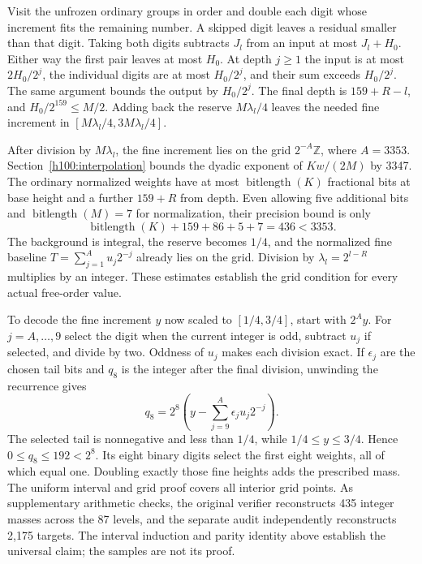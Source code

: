 Visit the unfrozen ordinary groups in order and double each digit whose increment fits the remaining number. A skipped digit leaves a residual smaller than that digit. Taking both digits subtracts \(J_l\) from an input at most \(J_l+H_0\). Either way the first pair leaves at most \(H_0\). At depth \(j\ge1\) the input is at most \(2H_0/2^j\), the individual digits are at most \(H_0/2^j\), and their sum exceeds \(H_0/2^j\). The same argument bounds the output by \(H_0/2^j\). The final depth is \(159+R-l\), and \(H_0/2^{159}\le M/2\). Adding back the reserve \(M\lambda_l/4\) leaves the needed fine increment in \([M\lambda_l/4,3M\lambda_l/4]\).

After division by \(M\lambda_l\), the fine increment lies on the grid \(2^{-A}\mathbb Z\), where \(A=3353\). Section~\ref{h100:interpolation} bounds the dyadic exponent of \(Kw/(2M)\) by 3347. The ordinary normalized weights have at most \(\operatorname{bitlength}(K)\) fractional bits at base height and a further \(159+R\) from depth. Even allowing five additional bits and \(\operatorname{bitlength}(M)=7\) for normalization, their precision bound is only \[
 \operatorname{bitlength}(K)+159+86+5+7=436<3353.
\] The background is integral, the reserve becomes \(1/4\), and the normalized fine baseline \(T=\sum_{j=1}^A u_j2^{-j}\) already lies on the grid. Division by \(\lambda_l=2^{l-R}\) multiplies by an integer. These estimates establish the grid condition for every actual free-order value.

To decode the fine increment \(y\) now scaled to \([1/4,3/4]\), start with \(2^Ay\). For \(j=A,\ldots,9\) select the digit when the current integer is odd, subtract \(u_j\) if selected, and divide by two. Oddness of \(u_j\) makes each division exact. If \(\epsilon_j\) are the chosen tail bits and \(q_8\) is the integer after the final division, unwinding the recurrence gives \[
 q_8=2^8\left(y-\sum_{j=9}^{A}\epsilon_j u_j2^{-j}\right).
\] The selected tail is nonnegative and less than \(1/4\), while \(1/4\le y\le3/4\). Hence \(0\le q_8\le192<2^8\). Its eight binary digits select the first eight weights, all of which equal one. Doubling exactly those fine heights adds the prescribed mass. The uniform interval and grid proof covers all interior grid points. As supplementary arithmetic checks, the original verifier reconstructs 435 integer masses across the 87 levels, and the separate audit independently reconstructs 2,175 targets. The interval induction and parity identity above establish the universal claim; the samples are not its proof.


